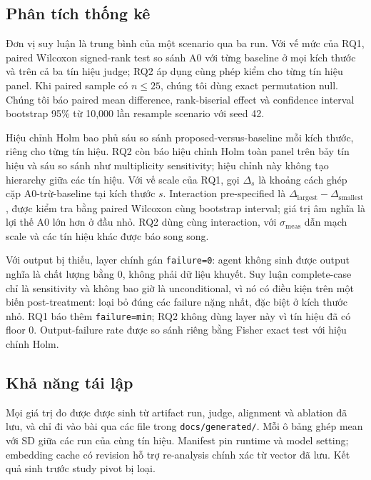 \subsection{Phân tích thống kê}
\label{sec:stats}

Đơn vị suy luận là trung bình của một scenario qua ba run. Với vế mức của RQ1,
paired Wilcoxon signed-rank test so sánh A0 với từng baseline ở mọi kích thước và
trên cả ba tín hiệu judge; RQ2 áp dụng cùng phép kiểm cho từng tín hiệu panel.
Khi paired sample có $n\leq25$, chúng tôi dùng exact permutation null. Chúng tôi
báo paired mean difference, rank-biserial effect và confidence interval bootstrap
95\% từ 10{,}000 lần resample scenario với seed 42.

Hiệu chỉnh Holm bao phủ sáu so sánh proposed-versus-baseline mỗi kích thước,
riêng cho từng tín hiệu. RQ2 còn báo hiệu chỉnh Holm toàn panel trên bảy tín hiệu
và sáu so sánh như multiplicity sensitivity; hiệu chỉnh này không tạo hierarchy
giữa các tín hiệu. Với vế scale của RQ1, gọi $\Delta_s$ là khoảng cách ghép cặp
A0-trừ-baseline tại kích thước $s$. Interaction pre-specified là
$\Delta_{\mathrm{largest}}-\Delta_{\mathrm{smallest}}$, được kiểm tra bằng paired
Wilcoxon cùng bootstrap interval; giá trị âm nghĩa là lợi thế A0 lớn hơn ở đầu
nhỏ. RQ2 dùng cùng interaction, với $\sigma_{\mathrm{meas}}$
dẫn mạch scale và các tín hiệu khác được báo song song.

Với output bị thiếu, layer chính gán \texttt{failure=0}: agent không sinh được
output nghĩa là chất lượng bằng 0, không phải dữ liệu khuyết. Suy luận
complete-case chỉ là sensitivity và không bao giờ là unconditional, vì nó có điều
kiện trên một biến post-treatment: loại bỏ đúng các failure nặng nhất, đặc biệt ở
kích thước nhỏ. RQ1 báo thêm \texttt{failure=min}; RQ2 không dùng layer này vì
tín hiệu đã có floor 0. Output-failure rate được so sánh riêng bằng Fisher exact
test với hiệu chỉnh Holm.

\subsection{Khả năng tái lập}
\label{sec:reproducibility}

Mọi giá trị đo được được sinh từ artifact run, judge, alignment và ablation đã
lưu, và chỉ đi vào bài qua các file trong \texttt{docs/generated/}. Mỗi ô bảng
ghép mean với SD giữa các run của cùng tín hiệu. Manifest pin runtime và model
setting; embedding cache có revision hỗ trợ re-analysis chính xác từ vector đã
lưu. Kết quả sinh trước study pivot bị loại.

